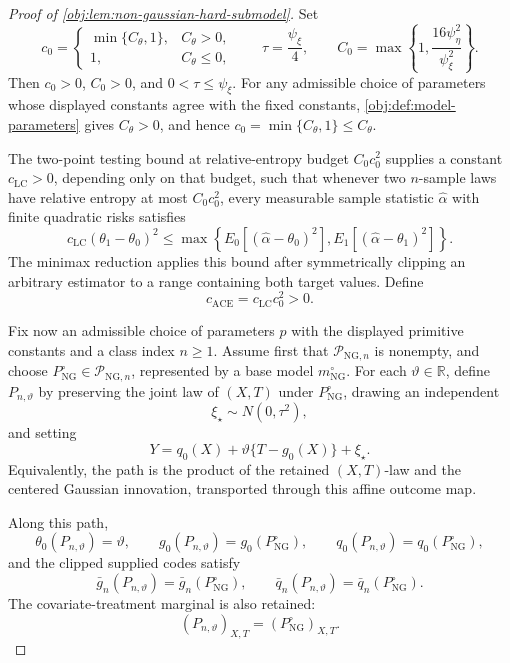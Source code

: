 \documentclass[11pt]{article}
\begin{document}
\begin{proof}[Proof of \cref{obj:lem:non-gaussian-hard-submodel}]
Set
\[
c_0=
\begin{cases}
\min\{C_{\theta},1\},& C_{\theta}>0,\\
1,& C_{\theta}\le 0,
\end{cases}
\qquad
\tau=\frac{\psi_{\xi}}4,
\qquad
C_0=\max\left\{1,\frac{16\psi_{\eta}^2}{\psi_{\xi}^2}\right\}.
\]
Then \(c_0>0\), \(C_0>0\), and \(0<\tau\le\psi_{\xi}\).  For any admissible choice of parameters whose displayed constants agree with the fixed constants, \cref{obj:def:model-parameters} gives \(C_{\theta}>0\), and hence \(c_0=\min\{C_{\theta},1\}\le C_{\theta}\). %

The two-point testing bound at relative-entropy budget \(C_0c_0^2\) supplies a constant \(c_{\mathrm{LC}}>0\), depending only on that budget, such that whenever two \(n\)-sample laws have relative entropy at most \(C_0c_0^2\), every measurable sample statistic \(\widehat\alpha\) with finite quadratic risks satisfies
\[
c_{\mathrm{LC}}(\theta_1-\theta_0)^2
\le
\max\left\{
E_0[(\widehat\alpha-\theta_0)^2],
E_1[(\widehat\alpha-\theta_1)^2]
\right\}.
\]
The minimax reduction applies this bound after symmetrically clipping an arbitrary estimator to a range containing both target values.  Define
\[
c_{\mathrm{ACE}}=c_{\mathrm{LC}}c_0^2>0 .
\]

Fix now an admissible choice of parameters \(p\) with the displayed primitive constants and a class index \(n\ge1\).  Assume first that \(\mathcal P_{\mathrm{NG},n}\) is nonempty, and choose \(P_{\mathrm{NG}}^\circ\in\mathcal P_{\mathrm{NG},n}\), represented by a base model \(m_{\mathrm{NG}}^\circ\).  For each \(\vartheta\in\mathbb R\), define \(P_{n,\vartheta}\) by preserving the joint law of \((X,T)\) under \(P_{\mathrm{NG}}^\circ\), drawing an independent
\[
\xi_\star\sim N(0,\tau^2),
\]
and setting
\[
Y=q_0(X)+\vartheta\{T-g_0(X)\}+\xi_\star .
\]
Equivalently, the path is the product of the retained \((X,T)\)-law and the centered Gaussian innovation, transported through this affine outcome map. %

Along this path,
\[
\theta_0(P_{n,\vartheta})=\vartheta,
\qquad
g_0(P_{n,\vartheta})=g_0(P_{\mathrm{NG}}^\circ),
\qquad
q_0(P_{n,\vartheta})=q_0(P_{\mathrm{NG}}^\circ),
\]
and the clipped supplied codes satisfy
\[
\bar g_n(P_{n,\vartheta})=\bar g_n(P_{\mathrm{NG}}^\circ),
\qquad
\bar q_n(P_{n,\vartheta})=\bar q_n(P_{\mathrm{NG}}^\circ).
\]
The covariate-treatment marginal is also retained:
\[
(P_{n,\vartheta})_{X,T}=(P_{\mathrm{NG}}^\circ)_{X,T}.
\]


\end{proof}
\end{document}
